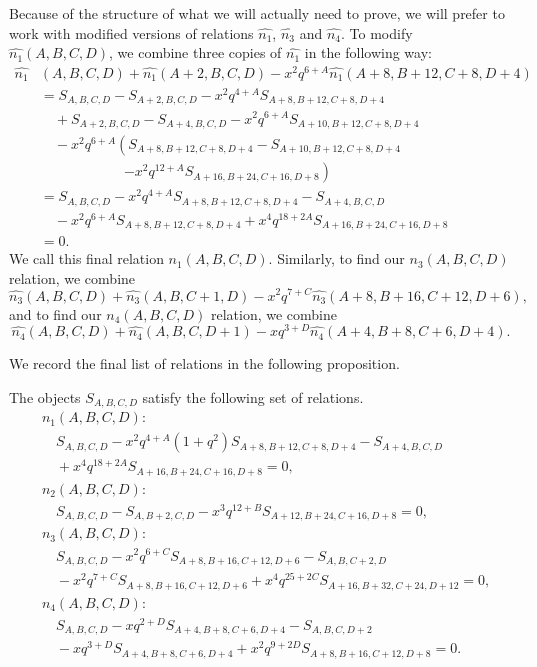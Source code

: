 \documentclass[ALCO,Unicode,published]{cedram}
\begin{document}
Because of the structure of what we will actually need to prove, we will prefer to work with modified versions of 
relations $\widehat{n_1}$, $\widehat{n_3}$ and $\widehat{n_4}$.
To modify $\widehat{n_1}(A,B,C,D)$, we combine three copies of $\widehat{n_1}$ in  the following way:
\begin{align*}
\widehat{n_1}&(A,B,C,D)+\widehat{n_1}(A+2,B,C,D)-x^2q^{6+A}\widehat{n_1}(A+8,B+12,C+8,D+4) \\
&=S_{A,B,C,D}-S_{A+2,B,C,D}-x^2q^{4+A}S_{A+8,B+12,C+8,D+4} \\ 
&\quad+S_{A+2,B,C,D}-S_{A+4,B,C,D}-x^2q^{6+A}S_{A+10,B+12,C+8,D+4}\\
&\quad-x^2q^{6+A}\left(S_{A+8,B+12,C+8,D+4}-S_{A+10,B+12,C+8,D+4}\right.\\
\nonumber &\qquad\qquad\qquad\left.-x^2q^{12+A}S_{A+16,B+24,C+16,D+8}\right) \\
&= S_{A,B,C,D}-x^2q^{4+A}S_{A+8,B+12,C+8,D+4}-S_{A+4,B,C,D}\\
&\quad-x^2q^{6+A}S_{A+8,B+12,C+8,D+4}+x^4q^{18+2A}S_{A+16,B+24,C+16,D+8} \\
&= 0.
\end{align*}
We call this final relation $n_1(A,B,C,D)$. Similarly, to find our ${n_3}(A,B,C,D)$ relation, we combine 
$$\widehat{n_3}(A,B,C,D) + \widehat{n_3}(A,B,C+1,D) - x^2 q^{7+C}  \widehat{n_3}(A+8,B+16,C+12,D+6),$$
and to find our ${n_4}(A,B,C,D)$ relation, we combine 
$$\widehat{n_4}(A,B,C,D) + \widehat{n_4}(A,B,C,D+1) - xq^{3+D} \widehat{n_4}(A+4,B+8,C+6,D+4).$$

We record the final list of relations in the following proposition.
\begin{prop}
\label{prop:nandirels}
The objects $S_{A,B,C,D}$ satisfy the following set of relations.
\begin{align}
&n_1(A,B,C,D):\nonumber\\&\quad S_{A,B,C,D}-x^2q^{4+A}(1+q^2)S_{A+8,B+12,C+8,D+4} -S_{A+4,B,C,D}\nonumber\\
&\quad+x^4q^{18+2A}S_{A+16,B+24,C+16,D+8} =0, \label{eqn:reln1}\\
&n_2(A,B,C,D):\nonumber\\&\quad S_{A,B,C,D}-S_{A,B+2,C,D}-x^3q^{12+B}S_{A+12,B+24,C+16,D+8} =0, \label{eqn:reln2}\\
&{n_3}(A,B,C,D):\nonumber\\&\quad S_{A,B,C,D}-x^2q^{6+C}S_{A+8,B+16,C+12,D+6}-S_{A,B,C+2,D} \nonumber\\ 
&\quad-x^2q^{7+C}S_{A+8,B+16,C+12,D+6}+x^4q^{25+2C}S_{A+16,B+32,C+24,D+12} =0, \label{eqn:reln3}\\
&{n_4}(A,B,C,D):\nonumber\\&\quad S_{A,B,C,D}-xq^{2+D}S_{A+4,B+8,C+6,D+4}-S_{A,B,C,D+2} \nonumber\\ 
&\quad-xq^{3+D}S_{A+4,B+8,C+6,D+4}+x^2q^{9+2D}S_{A+8,B+16,C+12,D+8} = 0.
\label{eqn:reln4}
\end{align}
\end{prop}
\end{document}
